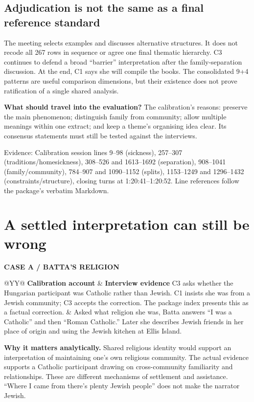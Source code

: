 \documentclass[10pt,a4paper]{article}
\newcommand{\kicker}[1]{{\sffamily\small\bfseries\color{teal}#1}\par\vspace{5pt}}
\newcommand{\source}[1]{{\footnotesize\color{muted}Evidence: #1}\par}
\newcommand{\page}[2]{\clearpage\kicker{#1}\section*{#2}}
\begin{document}
\subsection*{Adjudication is not the same as a final reference standard}
The meeting selects examples and discusses alternative structures. It does not recode all 267 rows in sequence or agree one final thematic hierarchy. C3 continues to defend a broad ``barrier'' interpretation after the family-separation discussion. At the end, C1 says she will compile the books. The consolidated 9+4 patterns are useful comparison dimensions, but their existence does not prove ratification of a single shared analysis.

\begin{takeaway}
\textbf{What should travel into the evaluation?} The calibration's reasons: preserve the main phenomenon; distinguish family from community; allow multiple meanings within one extract; and keep a theme's organising idea clear. Its consensus statements must still be tested against the interviews.
\end{takeaway}
\source{Calibration session lines 9--98 (sickness), 257--307 (traditions/homesickness), 308--526 and 1613--1692 (separation), 908--1041 (family/community), 784--907 and 1090--1152 (splits), 1153--1249 and 1296--1432 (constraints/structure), closing turns at 1:20:41--1:20:52. Line references follow the package's verbatim Markdown.}

\page{04 / ADJUDICATION UNDER TEST}{A settled interpretation can still be wrong}
\kicker{CASE A / BATTA'S RELIGION}
\begin{tabularx}{\linewidth}{@{}YY@{}}
\toprule
\textbf{Calibration account} & \textbf{Interview evidence}\tabularnewline\midrule
C3 asks whether the Hungarian participant was Catholic rather than Jewish. C1 insists she was from a Jewish community; C3 accepts the correction. The package index presents this as a factual correction. & Asked what religion she was, Batta answers ``I was a Catholic'' and then ``Roman Catholic.'' Later she describes Jewish friends in her place of origin and using the Jewish kitchen at Ellis Island.\tabularnewline\bottomrule
\end{tabularx}

\textbf{Why it matters analytically.} Shared religious identity would support an interpretation of maintaining one's own religious community. The actual evidence supports a Catholic participant drawing on cross-community familiarity and relationships. These are different mechanisms of settlement and assistance. ``Where I came from there's plenty Jewish people'' does not make the narrator Jewish.
\end{document}
